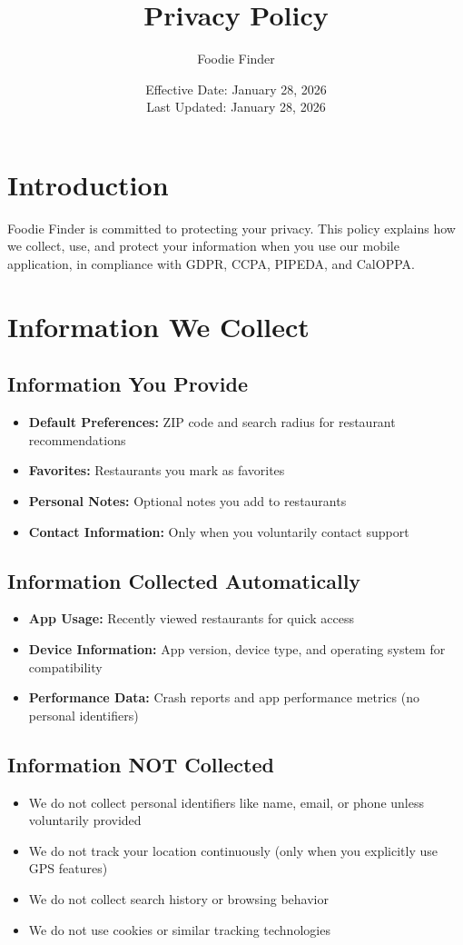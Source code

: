\documentclass[11pt,letterpaper]{article}
\title{\textbf{Privacy Policy}}
\author{Foodie Finder}
\date{Effective Date: January 28, 2026 \\ Last Updated: January 28, 2026}
\begin{document}
\maketitle
\thispagestyle{empty}

\section{Introduction}

Foodie Finder is committed to protecting your privacy. This policy explains how we collect, use, and protect your information when you use our mobile application, in compliance with GDPR, CCPA, PIPEDA, and CalOPPA.

\section{Information We Collect}

\subsection{Information You Provide}
\begin{itemize}
    \item \textbf{Default Preferences:} ZIP code and search radius for restaurant recommendations
    \item \textbf{Favorites:} Restaurants you mark as favorites
    \item \textbf{Personal Notes:} Optional notes you add to restaurants
    \item \textbf{Contact Information:} Only when you voluntarily contact support
\end{itemize}

\subsection{Information Collected Automatically}
\begin{itemize}
    \item \textbf{App Usage:} Recently viewed restaurants for quick access
    \item \textbf{Device Information:} App version, device type, and operating system for compatibility
    \item \textbf{Performance Data:} Crash reports and app performance metrics (no personal identifiers)
\end{itemize}

\subsection{Information NOT Collected}
\begin{itemize}
    \item We do not collect personal identifiers like name, email, or phone unless voluntarily provided
    \item We do not track your location continuously (only when you explicitly use GPS features)
    \item We do not collect search history or browsing behavior
    \item We do not use cookies or similar tracking technologies
\end{itemize}
\end{document}
